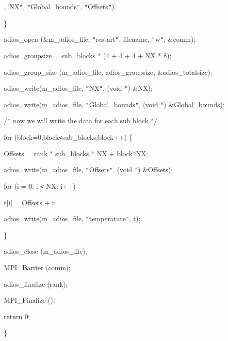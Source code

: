 \vspace{10pt}
,\texttt{"}NX\texttt{"}, \texttt{"}Global\_bounds\texttt{"}, \texttt{"}Offsets\texttt{"});

\vspace{10pt}
\parindent=115pt
\}

\vspace{23pt}
\parindent=28pt
adios\_open (\&m\_adios\_file, \texttt{"}restart\texttt{"}, filename, \texttt{"}w\texttt{"}, 
\&comm);

\vspace{23pt}
adios\_groupsize = sub\_blocks * (4 + 4 + 4 + NX * 8);

\vspace{23pt}
\parindent=57pt
adios\_group\_size (m\_adios\_file, adios\_groupsize, \&adios\_totalsize);

\vspace{10pt}
\parindent=28pt
adios\_write(m\_adios\_file, \texttt{"}NX\texttt{"}, (void *) \&NX);

\vspace{10pt}
adios\_write(m\_adios\_file, \texttt{"}Global\_bounds\texttt{"}, (void *) \&Global\_bounds);

\vspace{10pt}
\parindent=54pt
/* now we will write the data for each sub block */

\vspace{10pt}
\parindent=28pt
for (block=0;block\texttt{<}sub\_blocks;block++) \{

\vspace{23pt}
\parindent=39pt
Offsets = rank * sub\_blocks * NX + block*NX;

\vspace{10pt}
adios\_write(m\_adios\_file, \texttt{"}Offsets\texttt{"}, (void *) \&Offsets);

\vspace{23pt}
\parindent=79pt
for (i = 0; i \texttt{<} NX; i++)

\vspace{10pt}
\parindent=54pt
t[i] = Offsets + i;

\vspace{23pt}
\parindent=39pt
adios\_write(m\_adios\_file, \texttt{"}temperature\texttt{"}, t);

\vspace{10pt}
\parindent=28pt
\}

\vspace{23pt}
adios\_close (m\_adios\_file);

\vspace{23pt}
\parindent=57pt
MPI\_Barrier (comm);

\vspace{23pt}
\parindent=28pt
adios\_finalize (rank);

\vspace{23pt}
MPI\_Finalize ();

\vspace{10pt}
\parindent=57pt
return 0;

\vspace{10pt}
\parindent=0pt
\}